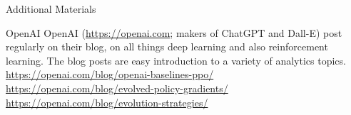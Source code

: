 \documentclass[ignorenonframetext,xcolor=x11names]{beamer}
\begin{document}
\begin{frame}[allowframebreaks]{Additional Materials}
\begin{block}{OpenAI}
OpenAI (\url{https://openai.com}; makers of ChatGPT and Dall-E) post regularly on their blog, on all things deep learning and also reinforcement learning. The blog posts are easy introduction to a variety of analytics topics. \\
\vspace{.5\baselineskip}
\url{https://openai.com/blog/openai-baselines-ppo/} \\
\vspace{.5\baselineskip}
\url{https://openai.com/blog/evolved-policy-gradients/} \\
\vspace{.5\baselineskip}
\url{https://openai.com/blog/evolution-strategies/}
\end{block}

\end{frame}
\end{document}
